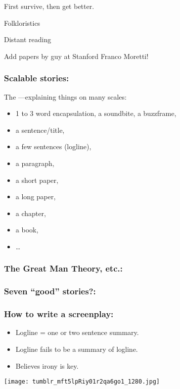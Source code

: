 First survive, then get better.


Folkloristics
\cite{abello2012a}

Distant reading

Add papers by guy at Stanford
Franco Moretti!


\begin{frame}
  \frametitle{Scalable stories:}

  \begin{block}{The ---explaining things on many scales:}
    \begin{itemize}
    \item 
      1 to 3 word encapsulation, a soundbite, a buzzframe,
    \item 
      a sentence/title,
    \item 
      a few sentences (logline),
    \item 
      a paragraph,
    \item 
      a short paper,
    \item 
      a long paper,
    \item 
      a chapter,
    \item 
      a book,
    \item 
      \ldots
    \end{itemize}
  \end{block}

\end{frame}

\begin{frame}
  \frametitle{The Great Man Theory, etc.:}

  \bigskip

\end{frame}


\begin{frame}
  \frametitle{Seven ``good'' stories?:}

\end{frame}

\begin{frame}
  \frametitle{How to write a screenplay:}


  \begin{itemize}
  \item 
    Logline = one or two sentence summary.
  \item 
    Logline fails to be a summary of logline.
  \item 
    Believes irony is key.
  \end{itemize}
\end{frame}


\begin{frame}
  
  \begin{center}
    \texttt{[image: tumblr\_mft5lpRiy01r2qa6go1\_1280.jpg]}
  \end{center}

\end{frame}
